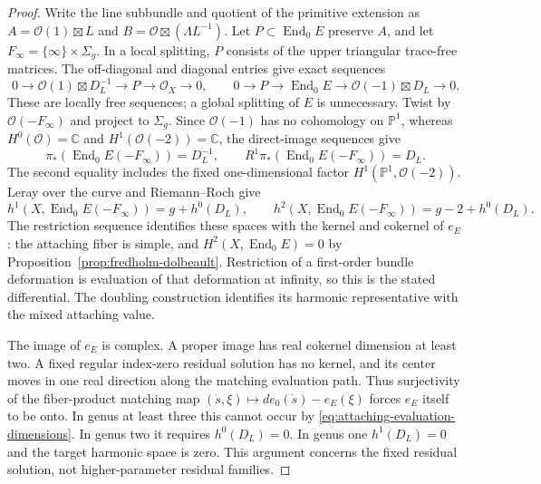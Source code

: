 \documentclass[11pt]{amsart}
\theoremstyle{definition}
\theoremstyle{remark}
\theoremstyle{plain}
\newcommand{\CC}{\mathbb{C}}
\newcommand{\PP}{\mathbb{P}}
\newcommand{\cO}{\mathcal{O}}
\newcommand{\End}{\operatorname{End}}
\begin{document}
\begin{proof}
Write the line subbundle and quotient of the primitive extension
as $A=\cO(1)\boxtimes L$ and
$B=\cO\boxtimes(\Lambda L^{-1})$. Let
$P\subset\End_0E$ preserve $A$, and let
$F_\infty=\{\infty\}\times\Sigma_g$. In a local splitting,
$P$ consists of the upper triangular trace-free matrices.
The off-diagonal and diagonal entries give exact sequences
\[
 0\longrightarrow\cO(1)\boxtimes D_L^{-1}
     \longrightarrow P\longrightarrow\cO_X\longrightarrow0,
 \qquad
 0\longrightarrow P\longrightarrow\End_0E
     \longrightarrow\cO(-1)\boxtimes D_L\longrightarrow0.
\]
These are locally free sequences; a global splitting of $E$
is unnecessary. Twist by $\cO(-F_\infty)$ and project to
$\Sigma_g$. Since $\cO(-1)$ has no cohomology on $\PP^1$,
whereas $H^0(\cO)=\CC$ and $H^1(\cO(-2))=\CC$, the
direct-image sequences give
\begin{equation}\label{eq:twisted-end-direct-images}
 \pi_*(\End_0E(-F_\infty))=D_L^{-1},\qquad
 R^1\pi_*(\End_0E(-F_\infty))=D_L.
\end{equation}
The second equality includes the fixed one-dimensional factor
$H^1(\PP^1,\cO(-2))$. Leray over the curve and
Riemann--Roch give
\[
 h^1(X,\End_0E(-F_\infty))=g+h^0(D_L),\qquad
 h^2(X,\End_0E(-F_\infty))=g-2+h^0(D_L).
\]
The restriction sequence identifies these spaces with the kernel
and cokernel of $e_E$: the attaching fiber is simple, and
$H^2(X,\End_0E)=0$ by
Proposition~\ref{prop:fredholm-dolbeault}.
Restriction of a first-order bundle deformation is evaluation
of that deformation at infinity, so this is the stated
differential. The doubling construction identifies its harmonic
representative with the mixed attaching value.

The image of $e_E$ is complex. A proper image has real cokernel
dimension at least two. A fixed regular index-zero residual
solution has no kernel, and its center moves in one real
direction along the matching evaluation path. Thus surjectivity
of the fiber-product matching map
$(\dot s,\xi)\mapsto de_0(\dot s)-e_E(\xi)$ forces $e_E$
itself to be onto. In genus at least three this cannot occur
by \eqref{eq:attaching-evaluation-dimensions}. In genus two
it requires $h^0(D_L)=0$. In genus one $h^1(D_L)=0$
and the target harmonic space is zero. This argument concerns
the fixed residual solution, not higher-parameter residual
families.


\end{proof}
\end{document}

